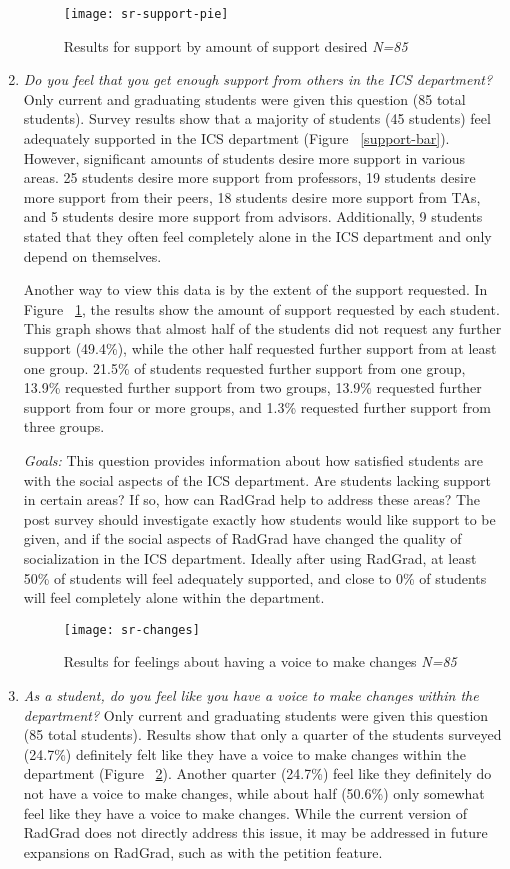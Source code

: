 \begin{enumerate}
\begin{figure}[h]
\centering
\texttt{[image: sr-support-pie]}
\caption{Results for support by amount of support desired \textit{N=85}}
\label{support-pie}
\end{figure}
\item \textit{Do you feel that you get enough support from others in the ICS department?}
Only current and graduating students were given this question (85 total students). Survey results show that a majority of students (45 students) feel adequately supported in the ICS department (Figure ~\ref{support-bar}). However, significant amounts of students desire more support in various areas. 25 students desire more support from professors, 19 students desire more support from their peers, 18 students desire more support from TAs, and 5 students desire more support from advisors. Additionally, 9 students stated that they often feel completely alone in the ICS department and only depend on themselves. 

Another way to view this data is by the extent of the support requested. In Figure ~\ref{support-pie}, the results show the amount of support requested by each student. This graph shows that almost half of the students did not request any further support (49.4\%), while the other half requested further support from at least one group. 21.5\% of students requested further support from one group, 13.9\% requested further support from two groups, 13.9\% requested further support from four or more groups, and 1.3\% requested further support from three groups.  

\textit{Goals:} This question provides information about how satisfied students are with the social aspects of the ICS department. Are students lacking support in certain areas? If so, how can RadGrad help to address these areas? The post survey should investigate exactly how students would like support to be given, and if the social aspects of RadGrad have changed the quality of socialization in the ICS department. Ideally after using RadGrad, at least 50\% of students will feel adequately supported, and close to 0\% of students will feel completely alone within the department.

\begin{figure}[h]
\centering
\texttt{[image: sr-changes]}
\caption{Results for feelings about having a voice to make changes \textit{N=85}}
\label{changes}
\end{figure}
\item \textit{As a student, do you feel like you have a voice to make changes within the department?}
Only current and graduating students were given this question (85 total students). Results show that only a quarter of the students surveyed (24.7\%) definitely felt like they have a voice to make changes within the department (Figure ~\ref{changes}). Another quarter (24.7\%) feel like they definitely do not have a voice to make changes, while about half (50.6\%) only somewhat feel like they have a voice to make changes. While the current version of RadGrad does not directly address this issue, it may be addressed in future expansions on RadGrad, such as with the petition feature. 


\end{enumerate}
